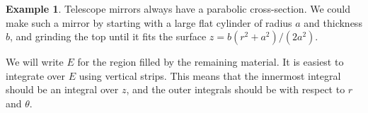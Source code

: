 \documentclass[reqno]{amsart}
\theoremstyle{definition}
\newtheorem{example}[theorem]{Example}
\begin{document}
\begin{example}
 Telescope mirrors always have a parabolic cross-section.  We could
 make such a mirror by starting with a large flat cylinder of radius
 $a$ and thickness $b$, and grinding the top until it fits the surface
 $z=b(r^2+a^2)/(2a^2)$.  
 \begin{center}
 \end{center}
 We will write $E$ for the region filled by
 the remaining material.  It is easiest to integrate over $E$ using
 vertical strips.  This means that the innermost integral should be an
 integral over $z$, and the outer integrals should be with respect to
 $r$ and $\theta$.  


\end{example}
\end{document}
